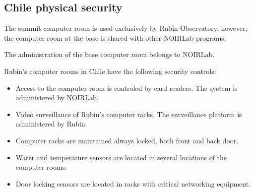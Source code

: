 \subsection{Chile physical security} \label{sec:chileps}

The summit computer room is used exclusively by Rubin Observatory, however,
the computer room at the base is shared with other NOIRLab programs.

The administration of the base computer room belongs to NOIRLab.

Rubin's computer rooms in Chile have the following security controls:
\begin{itemize}
\item Access to the computer room is controled by card readers. The system is administered by NOIRLab.
\item Video surveillance of Rubin's computer racks. The surveillance platform is administered by Rubin.
\item Computer racks are maintained always locked, both front and back door.
\item Water and temperature sensors are located in several locations of the computer rooms.
\item Door locking sensors are located in racks with critical networking equipment.
\end{itemize}
